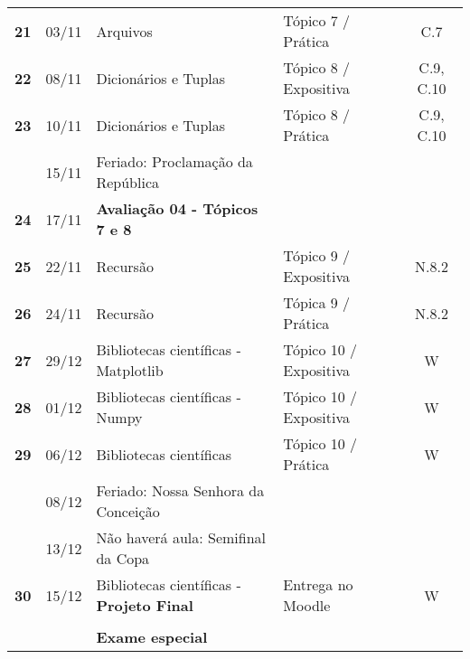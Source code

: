 \documentclass[a4paper, 11pt]{article}
\begin{document}
\begin{longtable}{>{\bfseries}ccp{7cm}lc}
\rowcolor{yellow!25} 21 & 03/11 & Arquivos & Tópico 7 / Prática & C.7\\
\rowcolor{gray!25} 22 & 08/11 & Dicionários e Tuplas & Tópico 8 / Expositiva & C.9, C.10\\
\rowcolor{yellow!25} 23 & 10/11 & Dicionários e Tuplas & Tópico 8 / Prática & C.9, C.10\\
\rowcolor{green!25} & 15/11 & Feriado: Proclamação da República &  & \\
\rowcolor{red!15}  24 & 17/11 & \textbf{Avaliação 04 - Tópicos 7 e 8} &  & \\
\rowcolor{gray!25} 25 & 22/11 & Recursão & Tópico 9 / Expositiva & N.8.2\\
\rowcolor{yellow!25} 26 & 24/11 & Recursão & Tópica 9 / Prática & N.8.2\\
\rowcolor{gray!25} 27 & 29/12 & Bibliotecas científicas - Matplotlib & Tópico 10 / Expositiva & W\\
\rowcolor{gray!25} 28 & 01/12 & Bibliotecas científicas - Numpy & Tópico 10 / Expositiva & W\\
\rowcolor{yellow!25} 29 & 06/12 & Bibliotecas científicas & Tópico 10 / Prática & W\\
\rowcolor{green!25} & 08/12 & Feriado: Nossa Senhora da Conceição &  & \\
\rowcolor{green!25} & 13/12 & Não haverá aula: Semifinal da Copa &  & \\
\rowcolor{yellow!25} 30 & 15/12 & Bibliotecas científicas - \textbf{Projeto Final} & Entrega no Moodle & W\\
 &  &  &  & \\
\rowcolor{red!15} &  & \textbf{Exame especial} &  & \\
\bottomrule
\end{longtable}
\end{document}
